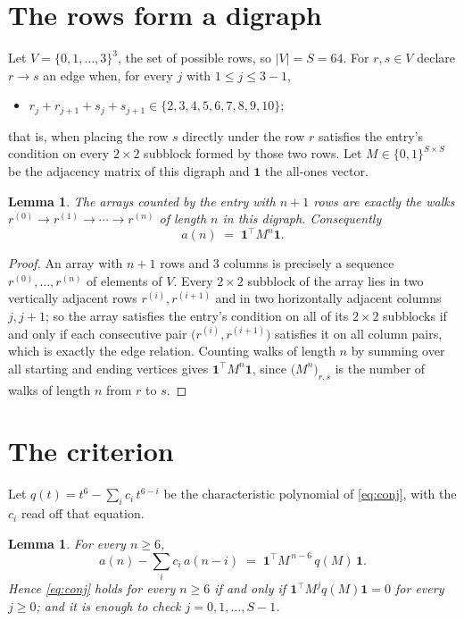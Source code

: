 \documentclass[11pt,a4paper]{article}
\theoremstyle{plain}
\newtheorem{lemma}[theorem]{Lemma}
\theoremstyle{definition}
\begin{document}
\section{The rows form a digraph}

Let $V=\{0,1,\dots,3\}^{3}$, the set of possible rows, so $|V|=S=64$. For
$r,s\in V$ declare $r\to s$ an edge when, for every $j$ with $1\le j\le 3-1$,
\begin{itemize}
\item $r_j+r_{j+1}+s_j+s_{j+1}\in\{2, 3, 4, 5, 6, 7, 8, 9, 10\}$;

\end{itemize}
that is, when placing the row $s$ directly under the row $r$ satisfies the entry's
condition on every $2\times2$ subblock formed by those two rows. Let $M\in\{0,1\}^{S\times
S}$ be the adjacency matrix of this digraph and $\mathbf{1}$ the all-ones vector.

\begin{lemma}\label{lem:walk}
The arrays counted by the entry with $n+1$ rows are exactly the walks
$r^{(0)}\to r^{(1)}\to\cdots\to r^{(n)}$ of length $n$ in this digraph. Consequently
\[
a(n)\;=\;\mathbf{1}^{\!\top}M^{n}\mathbf{1} .
\]
\end{lemma}

\begin{proof}
An array with $n+1$ rows and $3$ columns is precisely a sequence
$r^{(0)},\dots,r^{(n)}$ of elements of $V$. Every $2\times2$ subblock of the array lies
in two vertically adjacent rows $r^{(i)},r^{(i+1)}$ and in two horizontally adjacent
columns $j,j+1$; so the array satisfies the entry's condition on all of its $2\times2$
subblocks if and only if each consecutive pair $\bigl(r^{(i)},r^{(i+1)}\bigr)$ satisfies
it on all column pairs, which is exactly the edge relation. Counting walks of length $n$ by
summing over all starting and ending vertices gives
$\mathbf{1}^{\!\top}M^{n}\mathbf{1}$, since
$\bigl(M^{n}\bigr)_{r,s}$ is the number of walks of length $n$ from $r$ to $s$.
\end{proof}

\section{The criterion}

Let $q(t)=t^{6}-\sum_{i}c_i\,t^{6-i}$ be the characteristic polynomial of
\eqref{eq:conj}, with the $c_i$ read off that equation.

\begin{lemma}\label{lem:crit}
For every $n\ge6$,
\[
a(n)-\sum_i c_i\,a(n-i)\;=\;\mathbf{1}^{\!\top}M^{\,n-6}\,q(M)\,\mathbf{1} .
\]
Hence \eqref{eq:conj} holds for every $n\ge6$ if and only if
$\mathbf{1}^{\!\top}M^{j}q(M)\mathbf{1}=0$ for every $j\ge0$; and it is enough to
check $j=0,1,\dots,S-1$.
\end{lemma}
\end{document}
